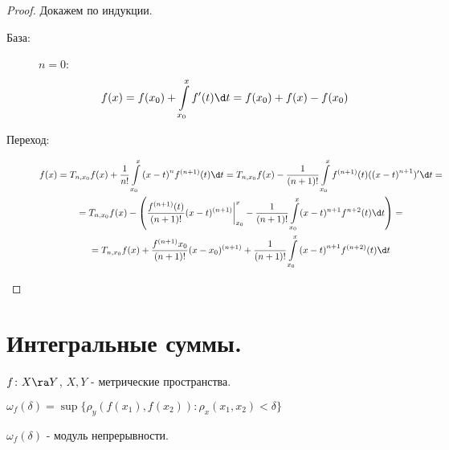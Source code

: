 \begin{proof}
	Докажем по индукции.
	
	\begin{description}
		\item[База:] $n = 0$:
		$$f(x) = f(x_0) + \int\limits_{x_0}^{x}f'(t)\d t = f(x_0) + f(x) - f(x_0)$$
		\item[Переход:] 
		\begin{gather*}
			f(x) = T_{n, x_0}f(x) + \frac{1}{n!}\int\limits_{x_0}^x{(x - t)}^nf^{(n + 1)}(t)\d t = T_{n, x_0}f(x) - \frac{1}{(n + 1)!}
			\int\limits_{x_0}^xf^{(n + 1)}(t)({(x - t)}^{n + 1})'\d t = \\
			= T_{n, x_0}f(x) - \left(\frac{f^{(n + 1)}(t)}{(n + 1)!}(x - t)^{(n + 1)}\biggr|_{x_0}^{x} - \frac{1}{(n + 1)!}\int\limits_{x_0}^x(x - t)^{n + 1}f^{n + 2}(t)\d t \right) = \\
			= T_{n, x_0}f(x) + \frac{f^{(n + 1)}x_0}{(n + 1)!}(x - x_0)^{(n + 1)} + \frac{1}{(n + 1)!}\int\limits_{x_0}^x{(x - t)}^{n + 1}f^{(n + 2)}(t)\d t
		\end{gather*}
	\end{description}
\end{proof}

\section{Интегральные суммы.}
\begin{Def}{}
	$f \colon X \ra Y$, $X, Y$ - метрические пространства.

	$\omega_f(\delta) = \sup\{\rho_y(f(x_1), f(x_2)): \rho_x(x_1, x_2) < \delta\}$

	$\omega_f(\delta)$ - модуль непрерывности.
\end{Def}

